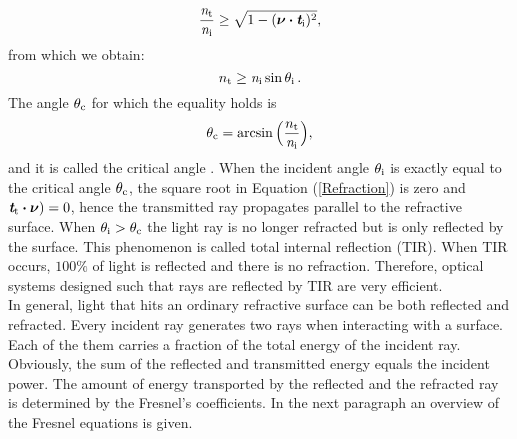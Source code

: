 \begin{equation}
\frac{\textit{n}_\textrm{t}}{\textit{n}_\textrm{i}}\geq \sqrt{1-(\boldsymbol{\nu}\boldsymbol{\cdot}\textit{\textbf{t}}_\textrm{i})^2},
\end{equation}
from which we obtain:
\begin{equation}
 n_\textrm{t}\geq \textit{n}_\textrm{i} \sin\theta_\textrm{i}\,.
\end{equation}
 The angle $\theta_{\textrm{c}}$ for which the equality holds is
\begin{equation}\label{critical}
\theta_{\textrm{c}} = \arcsin\Big(\frac{n_\textrm{t}}{\textit{n}_\textrm{i}}\Big),
\end{equation} and it is called the critical angle \cite{chaves2015introduction}.
When the incident angle $\theta_{\textrm{i}}$ is exactly equal to the critical angle $\theta_{\textrm{c}}$, the square root in Equation (\ref{Refraction}) is zero and $\textit{\textbf{t}}_\textrm{t}\boldsymbol{\cdot}\boldsymbol{\nu})=0$, hence the transmitted ray propagates parallel to the refractive surface. 
When $\theta_{\textrm{i}}>\theta_{\textrm{c}}$ the light ray is no longer refracted but is only reflected by the surface. This phenomenon is called total internal reflection (TIR). When TIR occurs, $100\%$ of light is reflected and there is no refraction. Therefore, optical systems designed such that rays are reflected by TIR are very efficient. \\ \indent 
In general, light that hits an ordinary refractive surface can be both reflected and refracted. Every incident ray generates two rays when interacting with a surface. Each of the them carries a fraction of the total energy of the incident ray. Obviously, the sum of the reflected and transmitted energy equals the incident power.
The amount of energy transported by the reflected and the refracted ray is determined by the Fresnel's coefficients.
In the next paragraph an overview of the Fresnel equations is given.
